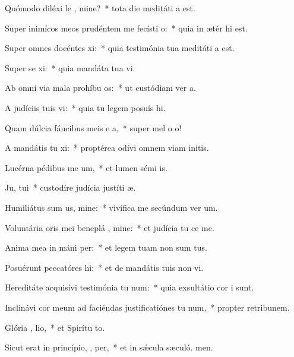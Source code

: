 \item Quómodo diléxi le , mine?~* tota die meditáti a est.
\item Super inimícos meos prudéntem me fecísti  o:~* quia in ætér hi est.
\item Super omnes docéntes  xi:~* quia testimónia tua meditáti a est.
\item Super se xi:~* quia mandáta tua vi.
\item Ab omni via mala prohíbu  os:~* ut custódiam ver a.
\item A judíciis tuis  vi:~* quia tu legem posuís hi.
\item Quam dúlcia fáucibus meis e a,~* super mel o o!
\item A mandátis tu xi:~* proptérea odívi omnem viam initis.
\item Lucérna pédibus me  um,~* et lumen sémi is.
\item Ju,  tui~* custodíre judícia justíti æ.
\item Humiliátus sum us, mine:~* vivífica me secúndum ver um.
\item Voluntária oris mei beneplá , mine:~* et judícia tu ce me.
\item Anima mea in máni  per:~* et legem tuam non sum tus.
\item Posuérunt peccatóres  hi:~* et de mandátis tuis non vi.
\item Hereditáte acquisívi testimónia tu  num:~* quia exsultátio cor i sunt.
\item Inclinávi cor meum ad faciéndas justificatiónes tu  num,~* propter retribunem.
\item Glória ,  lio,~* et Spirítu to.
\item Sicut erat in princípio,  ,  per,~* et in sǽcula sæculó. men.
